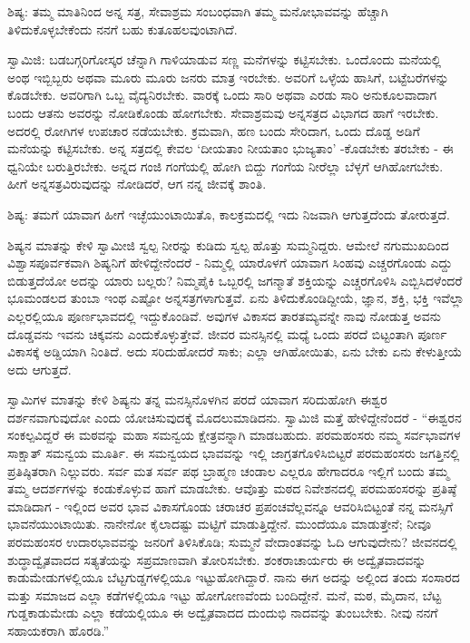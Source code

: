 ಶಿಷ್ಯ: ತಮ್ಮ ಮಾತಿನಿಂದ ಅನ್ನ ಸತ್ರ, ಸೇವಾಶ್ರಮ ಸಂಬಂಧವಾಗಿ ತಮ್ಮ ಮನೋಭಾವವನ್ನು ಹೆಚ್ಚಾಗಿ ತಿಳಿದುಕೊಳ್ಳಬೇಕೆಂದು ನನಗೆ ಬಹು ಕುತೂಹಲವುಂಟಾಗಿದೆ.

ಸ್ವಾಮಿಜಿ: ಬಡಬಗ್ಗರಿಗೋಸ್ಕರ ಚೆನ್ನಾಗಿ ಗಾಳಿಯಾಡುವ ಸಣ್ಣ ಮನೆಗಳನ್ನು ಕಟ್ಟಿಸಬೇಕು. ಒಂದೊಂದು ಮನೆಯಲ್ಲಿ ಅಂಥ ಇಬ್ಬಿಬ್ಬರು ಅಥವಾ ಮೂರು ಮೂರು ಜನರು ಮಾತ್ರ ಇರಬೇಕು. ಅವರಿಗೆ ಒಳ್ಳೆಯ ಹಾಸಿಗೆ, ಬಟ್ಟೆಬರೆಗಳನ್ನು ಕೊಡಬೇಕು. ಅವರಿಗಾಗಿ ಒಬ್ಬ ವೈದ್ಯನಿರಬೇಕು. ವಾರಕ್ಕೆ ಒಂದು ಸಾರಿ ಅಥವಾ ಎರಡು ಸಾರಿ ಅನುಕೂಲವಾದಾಗ ಬಂದು ಆತನು ಅವರನ್ನು ನೋಡಿಕೊಂಡು ಹೋಗಬೇಕು. ಸೇವಾಶ್ರಮವು ಅನ್ನಸತ್ರದ ವಿಭಾಗದ ಹಾಗೆ ಇರಬೇಕು. ಅದರಲ್ಲಿ ರೋಗಿಗಳ ಉಪಚಾರ ನಡೆಯಬೇಕು. ಕ್ರಮವಾಗಿ, ಹಣ ಬಂದು ಸೇರಿದಾಗ, ಒಂದು ದೊಡ್ಡ ಅಡಿಗೆ ಮನೆಯನ್ನು ಕಟ್ಟಿಸಬೇಕು. ಅನ್ನ ಸತ್ರದಲ್ಲಿ ಕೇವಲ ‘ದೀಯತಾಂ ನೀಯತಾಂ ಭುಜ್ಯತಾಂ’ -ಕೊಡಬೇಕು ತರಬೇಕು - ಈ ಧ್ವನಿಯೇ ಬರುತ್ತಿರಬೇಕು. ಅನ್ನದ ಗಂಜಿ ಗಂಗೆಯಲ್ಲಿ ಹೋಗಿ ಬಿದ್ದು ಗಂಗೆಯ ನೀರೆಲ್ಲಾ ಬೆಳ್ಳಗೆ ಆಗಿಹೋಗಬೇಕು. ಹೀಗೆ ಅನ್ನಸತ್ರವಿರುವುದನ್ನು ನೋಡಿದರೆ, ಆಗ ನನ್ನ ಜೀವಕ್ಕೆ ಶಾಂತಿ.

ಶಿಷ್ಯ: ತಮಗೆ ಯಾವಾಗ ಹೀಗೆ ಇಚ್ಛೆಯುಂಟಾಯಿತೊ, ಕಾಲಕ್ರಮದಲ್ಲಿ ಇದು ನಿಜವಾಗಿ ಆಗುತ್ತದೆಂದು ತೋರುತ್ತದೆ.

ಶಿಷ್ಯನ ಮಾತನ್ನು ಕೇಳಿ ಸ್ವಾಮೀಜಿ ಸ್ವಲ್ಪ ನೀರನ್ನು ಕುಡಿದು ಸ್ವಲ್ಪ ಹೊತ್ತು ಸುಮ್ಮನಿದ್ದರು. ಆಮೇಲೆ ನಗುಮುಖದಿಂದ ವಿಶ್ವಾಸಪೂರ್ವಕವಾಗಿ ಶಿಷ್ಯನಿಗೆ ಹೇಳಿದ್ದೇನೆಂದರೆ - ನಿಮ್ಮಲ್ಲಿ ಯಾರೊಳಗೆ ಯಾವಾಗ ಸಿಂಹವು ಎಚ್ಚರಗೊಂಡು ಎದ್ದು ಬಿಡುತ್ತದೆಯೋ ಅದನ್ನು ಯಾರು ಬಲ್ಲರು? ನಿಮ್ಮಪೈಕಿ ಒಬ್ಬರಲ್ಲಿ ಜಗನ್ಮಾತೆ ಶಕ್ತಿಯನ್ನು ಎಚ್ಚರಗೊಳಿಸಿ ಎಬ್ಬಿಸಿದಳೆಂದರೆ ಭೂಮಂಡಲದ ತುಂಬಾ ಇಂಥ ಎಷ್ಟೋ ಅನ್ನಸತ್ರಗಳಾಗುತ್ತವೆ. ಏನು ತಿಳಿದುಕೊಂಡಿದ್ದೀಯೆ, ಜ್ಞಾನ, ಶಕ್ತಿ, ಭಕ್ತಿ ಇವೆಲ್ಲಾ ಎಲ್ಲರಲ್ಲಿಯೂ ಪೂರ್ಣಭಾವದಲ್ಲಿ ಇದ್ದುಕೊಂಡಿವೆ. ಅವುಗಳ ವಿಕಾಸದ ತಾರತಮ್ಯವನ್ನೇ ನಾವು ನೋಡುತ್ತ ಅವನು ದೊಡ್ಡವನು ಇವನು ಚಿಕ್ಕವನು ಎಂದುಕೊಳ್ಳುತ್ತೇವೆ. ಜೀವರ ಮನಸ್ಸಿನಲ್ಲಿ ಮಧ್ಯೆ ಒಂದು ಪರದೆ ಬಿಟ್ಟಂತಾಗಿ ಪೂರ್ಣ ವಿಕಾಸಕ್ಕೆ ಅಡ್ಡಿಯಾಗಿ ನಿಂತಿದೆ. ಅದು ಸರಿದುಹೋದರೆ ಸಾಕು; ಎಲ್ಲಾ ಆಗಿಹೋಯಿತು, ಏನು ಬೇಕು ಏನು ಕೇಳುತ್ತೀಯೆ ಅದು ಆಗುತ್ತದೆ.

ಸ್ವಾಮಿಗಳ ಮಾತನ್ನು ಕೇಳಿ ಶಿಷ್ಯನು ತನ್ನ ಮನಸ್ಸಿನೊಳಗಿನ ಪರದೆ ಯಾವಾಗ ಸರಿದುಹೋಗಿ ಈಶ್ವರ ದರ್ಶನವಾಗುವುದೋ ಎಂದು ಯೋಚಿಸುವುದಕ್ಕೆ ಮೊದಲುಮಾಡಿದನು. ಸ್ವಾಮಿಜಿ ಮತ್ತೆ ಹೇಳಿದ್ದೇನೆಂದರೆ - “ಈಶ್ವರನ ಸಂಕಲ್ಪವಿದ್ದರೆ ಈ ಮಠವನ್ನು ಮಹಾ ಸಮನ್ವಯ ಕ್ಷೇತ್ರವನ್ನಾಗಿ ಮಾಡಬಹುದು. ಪರಮಹಂಸರು ನಮ್ಮ ಸರ್ವಭಾವಗಳ ಸಾಕ್ಷಾತ್ ಸಮನ್ವಯ ಮೂರ್ತಿ. ಈ ಸಮನ್ವಯದ ಭಾವವನ್ನು ಇಲ್ಲಿ ಜಾಗ್ರತಗೊಳಿಸಿಬಿಟ್ಟರೆ ಪರಮಹಂಸರು ಜಗತ್ತಿನಲ್ಲಿ ಪ್ರತಿಷ್ಠಿತರಾಗಿ ನಿಲ್ಲುವರು. ಸರ್ವ ಮತ ಸರ್ವ ಪಥ ಬ್ರಾಹ್ಮಣ ಚಂಡಾಲ ಎಲ್ಲರೂ ಹೇಗಾದರೂ ಇಲ್ಲಿಗೆ ಬಂದು ತಮ್ಮ ತಮ್ಮ ಆದರ್ಶಗಳನ್ನು ಕಂಡುಕೊಳ್ಳುವ ಹಾಗೆ ಮಾಡಬೇಕು. ಆವೊತ್ತು ಮಠದ ನಿವೇಶನದಲ್ಲಿ ಪರಮಹಂಸರನ್ನು ಪ್ರತಿಷ್ಠೆ ಮಾಡಿದಾಗ - ಇಲ್ಲಿಂದ ಅವರ ಭಾವ ವಿಕಾಸಗೊಂಡು ಚರಾಚರ ಪ್ರಪಂಚವೆಲ್ಲವನ್ನೂ ಆವರಿಸಿಬಿಟ್ಟಂತೆ ನನ್ನ ಮನಸ್ಸಿಗೆ ಭಾವನೆಯುಂಟಾಯಿತು. ನಾನೇನೋ ಕೈಲಾದಷ್ಟು ಮಟ್ಟಿಗೆ ಮಾಡುತ್ತಿದ್ದೇನೆ. ಮುಂದೆಯೂ ಮಾಡುತ್ತೇನೆ; ನೀವೂ ಪರಮಹಂಸರ ಉದಾರಭಾವವನ್ನು ಜನರಿಗೆ ತಿಳಿಸಿಕೊಡಿ; ಸುಮ್ಮನೆ ವೇದಾಂತವನ್ನು ಓದಿ ಆಗುವುದೇನು? ಜೀವನದಲ್ಲಿ ಶುದ್ಧಾದ್ವೈತವಾದದ ಸತ್ಯತೆಯನ್ನು ಸಪ್ರಮಾಣವಾಗಿ ತೋರಿಸಬೇಕು. ಶಂಕರಾಚಾರ್ಯರು ಈ ಅದ್ವೈತವಾದವನ್ನು ಕಾಡುಮೇಡುಗಳಲ್ಲಿಯೂ ಬೆಟ್ಟಗುಡ್ಡಗಳಲ್ಲಿಯೂ ಇಟ್ಟುಹೋಗಿದ್ದಾರೆ. ನಾನು ಈಗ ಅದನ್ನು ಅಲ್ಲಿಂದ ತಂದು ಸಂಸಾರದ ಮತ್ತು ಸಮಾಜದ ಎಲ್ಲಾ ಕಡೆಗಳಲ್ಲಿಯೂ ಇಟ್ಟು ಹೋಗೋಣವೆಂದು ಬಂದಿದ್ದೇನೆ. ಮನೆ, ಮಠ, ಮೈದಾನ, ಬೆಟ್ಟ ಗುಡ್ಡಕಾಡುಮೇಡು ಎಲ್ಲಾ ಕಡೆಯಲ್ಲಿಯೂ ಈ ಅದ್ವೈತವಾದದ ದುಂದುಭಿ ನಾದವನ್ನು ತುಂಬಬೇಕು. ನೀವು ನನಗೆ ಸಹಾಯಕರಾಗಿ ಹೊರಡಿ.”

